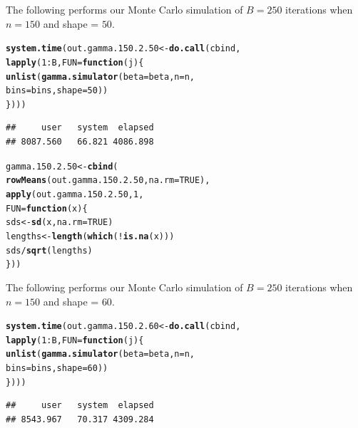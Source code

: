 \documentclass[11pt]{article}\usepackage[]{graphicx}\usepackage[]{color}
\makeatletter
\newcommand{\hlnum}[1]{\textcolor[rgb]{0.686,0.059,0.569}{#1}}%
\newcommand{\hlopt}[1]{\textcolor[rgb]{0,0,0}{#1}}%
\newcommand{\hlstd}[1]{\textcolor[rgb]{0.345,0.345,0.345}{#1}}%
\newcommand{\hlkwa}[1]{\textcolor[rgb]{0.161,0.373,0.58}{\textbf{#1}}}%
\newcommand{\hlkwb}[1]{\textcolor[rgb]{0.69,0.353,0.396}{#1}}%
\newcommand{\hlkwc}[1]{\textcolor[rgb]{0.333,0.667,0.333}{#1}}%
\newcommand{\hlkwd}[1]{\textcolor[rgb]{0.737,0.353,0.396}{\textbf{#1}}}%
\newenvironment{kframe}{%
 \def\at@end@of@kframe{}%
 \ifinner\ifhmode%
  \def\at@end@of@kframe{\end{minipage}}%
  \begin{minipage}{\columnwidth}%
 \fi\fi%
 \def\FrameCommand##1{\hskip\@totalleftmargin \hskip-\fboxsep
 \colorbox{shadecolor}{##1}\hskip-\fboxsep
     \hskip-\linewidth \hskip-\@totalleftmargin \hskip\columnwidth}%
 \MakeFramed {\advance\hsize-\width
   \@totalleftmargin\z@ \linewidth\hsize
   \@setminipage}}%
 {\par\unskip\endMakeFramed%
 \at@end@of@kframe}
\newenvironment{knitrout}{}{} %
\makeatother
\begin{document}
The following performs our Monte Carlo simulation of $B = 250$ iterations 
when $n = 150$ and shape = $50$.

\begin{knitrout}
\color{fgcolor}\begin{kframe}
\begin{alltt}
\hlkwd{system.time}\hlstd{(out.gamma.150.2.50} \hlkwb{<-} \hlkwd{do.call}\hlstd{(cbind,}
  \hlkwd{lapply}\hlstd{(}\hlnum{1}\hlopt{:}\hlstd{B,} \hlkwc{FUN} \hlstd{=} \hlkwa{function}\hlstd{(}\hlkwc{j}\hlstd{)\{}
    \hlkwd{unlist}\hlstd{(}\hlkwd{gamma.simulator}\hlstd{(}\hlkwc{beta} \hlstd{= beta,} \hlkwc{n} \hlstd{= n,}
      \hlkwc{bins} \hlstd{= bins,} \hlkwc{shape} \hlstd{=} \hlnum{50}\hlstd{))}
\hlstd{\})))}
\end{alltt}
\begin{verbatim}
##     user   system  elapsed 
## 8087.560   66.821 4086.898
\end{verbatim}
\end{kframe}
\end{knitrout}

\begin{knitrout}
\color{fgcolor}\begin{kframe}
\begin{alltt}
\hlstd{gamma.150.2.50} \hlkwb{<-} \hlkwd{cbind}\hlstd{(}
  \hlkwd{rowMeans}\hlstd{(out.gamma.150.2.50,} \hlkwc{na.rm} \hlstd{=} \hlnum{TRUE}\hlstd{),}
  \hlkwd{apply}\hlstd{(out.gamma.150.2.50,} \hlnum{1}\hlstd{,}
  \hlkwc{FUN} \hlstd{=} \hlkwa{function}\hlstd{(}\hlkwc{x}\hlstd{)\{}
    \hlstd{sds} \hlkwb{<-} \hlkwd{sd}\hlstd{(x,} \hlkwc{na.rm} \hlstd{=} \hlnum{TRUE}\hlstd{)}
    \hlstd{lengths} \hlkwb{<-} \hlkwd{length}\hlstd{(}\hlkwd{which}\hlstd{(}\hlopt{!}\hlkwd{is.na}\hlstd{(x)))}
    \hlstd{sds} \hlopt{/} \hlkwd{sqrt}\hlstd{(lengths)}
  \hlstd{\}))}
\end{alltt}
\end{kframe}
\end{knitrout}

The following performs our Monte Carlo simulation of $B = 250$ iterations 
when $n = 150$ and shape = $60$.

\begin{knitrout}
\color{fgcolor}\begin{kframe}
\begin{alltt}
\hlkwd{system.time}\hlstd{(out.gamma.150.2.60} \hlkwb{<-} \hlkwd{do.call}\hlstd{(cbind,}
  \hlkwd{lapply}\hlstd{(}\hlnum{1}\hlopt{:}\hlstd{B,} \hlkwc{FUN} \hlstd{=} \hlkwa{function}\hlstd{(}\hlkwc{j}\hlstd{)\{}
    \hlkwd{unlist}\hlstd{(}\hlkwd{gamma.simulator}\hlstd{(}\hlkwc{beta} \hlstd{= beta,} \hlkwc{n} \hlstd{= n,}
      \hlkwc{bins} \hlstd{= bins,} \hlkwc{shape} \hlstd{=} \hlnum{60}\hlstd{))}
\hlstd{\})))}
\end{alltt}
\begin{verbatim}
##     user   system  elapsed 
## 8543.967   70.317 4309.284
\end{verbatim}
\end{kframe}
\end{knitrout}
\end{document}
